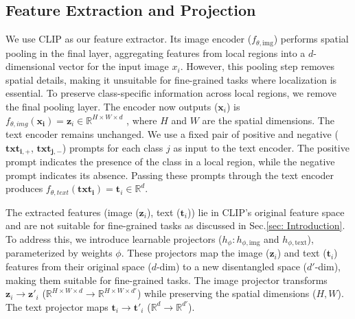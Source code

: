 \subsection{Feature Extraction and Projection}
\label{sec:Feature Extraction and Projection}
We use CLIP as our feature extractor. Its image encoder (\(f_{\theta,\text{img}}\)) performs spatial pooling in the final layer, aggregating features from local regions into a \(d\)-dimensional vector for the input image \(x_i\). However, this pooling step removes spatial details, making it unsuitable for fine-grained tasks where localization is essential. To preserve class-specific information across local regions, we remove the final pooling layer. The encoder now outputs ($\mathbf{x}_{i}$) is ${f}_{\theta, img}(\mathbf{x_{i}}) = \mathbf{z}_i \in \mathbb{R}^{H \times W \times d}$ , where \(H\) and \(W\) are the spatial dimensions. The text encoder remains unchanged. We use a fixed pair of positive and negative (\( \mathbf{txt_{i,+}} \), \( \mathbf{txt_{j,-}} \)) prompts for each class \( j \) as input to the text encoder. The positive prompt indicates the presence of the class in a local region, while the negative prompt indicates its absence. Passing these prompts through the text encoder produces ${f}_{\theta, text}(\mathbf{txt_{i}}) = \mathbf{t}_i \in \mathbb{R}^{d}$.
% 


The extracted features (image ($\mathbf{z}_i$), text ($\mathbf{t}_i $)) lie in CLIP's original feature space and are not suitable for fine-grained tasks as discussed in Sec.\ref{sec: Introduction}.  To address this, we introduce learnable projectors ($ h_\phi :  h_{\phi,\text{img}} $ and $ h_{\phi,\text{text}} $), parameterized by weights $ \phi $. These projectors map the image ($ \mathbf{z}_i $) and text ($ \mathbf{t}_i $) features from their original space ($ d $-dim) to a new disentangled space ($ d' $-dim), making them suitable for fine-grained tasks. The image projector transforms $ \mathbf{z}_i \to \mathbf{z'}_i $ ($ \mathbb{R}^{H \times W \times d} \to \mathbb{R}^{H \times W \times d'} $) while preserving the spatial dimensions ($H ,W$). The text projector maps $ \mathbf{t}_i \to \mathbf{t'}_i $ ($ \mathbb{R}^{d} \to \mathbb{R}^{d'} $).

